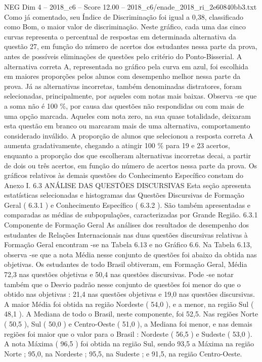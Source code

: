 \begin{textsample}{NEG Dim 4 – 2018\_c6 – Score 12.00 – 2018\_c6/enade\_2018\_ri\_2e60840bb3.txt}
Como já comentado, seu Índice de Discriminação foi igual a 0,38, classificado como Bom, o maior valor de discriminação.
Neste gráfico, cada uma das cinco curvas representa o percentual de respostas em determinada alternativa da questão 27, em função do número de acertos dos estudantes nessa parte da prova, antes de possíveis eliminações de questões pelo critério do Ponto-Bisserial.
A alternativa correta A, representada no gráfico pela curva em azul, foi escolhida em maiores proporções pelos alunos com desempenho melhor nessa parte da prova.
Já as alternativas incorretas, também denominadas distratores, foram selecionadas, principalmente, por aqueles com notas mais baixas.
Observa -se que a soma não é 100 \%, por causa das questões não respondidas ou com mais de uma opção marcada.
Aqueles com nota zero, na sua quase totalidade, deixaram esta questão em branco ou marcaram mais de uma alternativa, comportamento considerado inválido.
A proporção de alunos que selecionou a resposta correta A aumenta gradativamente, chegando a atingir 100 \% para 19 e 23 acertos, enquanto a proporção dos que escolheram alternativas incorretas decai, a partir de dois ou três acertos, em função do número de acertos nessa parte da prova.
Os gráficos relativos às demais questões do Conhecimento Específico constam do Anexo I. 6.3 ANÁLISE DAS QUESTÕES DISCURSIVAS Esta seção apresenta estatísticas selecionadas e histogramas das Questões Discursivas de Formação Geral ( 6.3.1 ) e Conhecimento Específico ( 6.3.2 ).
São também apresentadas e comparadas as médias de subpopulações, caracterizadas por Grande Região. 6.3.1 Componente de Formação Geral As análises dos resultados de desempenho dos estudantes de Relações Internacionais nas duas questões discursivas relativas à Formação Geral encontram -se na Tabela 6.13 e no Gráfico 6.6.
Na Tabela 6.13, observa -se que a nota Média nesse conjunto de questões foi abaixo da obtida nas objetivas.
Os estudantes de todo Brasil obtiveram, em Formação Geral, Média 72,3 nas questões objetivas e 50,4 nas questões discursivas.
Pode -se notar também que o Desvio padrão nesse conjunto de questões foi menor do que o obtido nas objetivas : 21,4 nas questões objetivas e 19,0 nas questões discursivas.
A maior Média foi obtida na região Nordeste ( 54,0 ), e a menor, na região Sul ( 48,1 ).
A Mediana de todo o Brasil, neste componente, foi 52,5.
Nas regiões Norte ( 50,5 ), Sul ( 50,0 ) e Centro-Oeste ( 51,0 ), a Mediana foi menor, e nas demais regiões foi maior que o valor para o Brasil : Nordeste ( 56,5 ) e Sudeste ( 53,0 ).
A nota Máxima ( 96,5 ) foi obtida na região Sul, sendo 93,5 a Máxima na região Norte ; 95,0, na Nordeste ; 95,5, na Sudeste ; e 91,5, na região Centro-Oeste.

\end{textsample}
